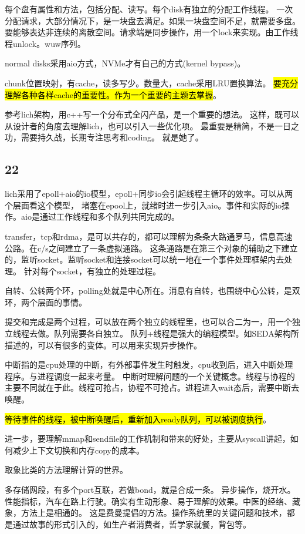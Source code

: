 每个盘有属性和方法，包括分配、读写。每个disk有独立的分配工作线程。
一次分配请求，大部分情况下，是一块盘去满足。如果一块盘空间不足，就需要多盘。
要能够表达非连续的离散空间。请求端是同步操作，用一个lock来实现。由工作线程unlock。wuw序列。

normal disks采用aio方式，NVMe才有自己的方式(kernel bypass)。

chunk位置映射，有cache，读多写少。数量大，cache采用LRU置换算法。
\hl{要充分理解各种各样cache的重要性。作为一个重要的主题去掌握}。

参考lich架构，用c++写一个分布式全闪产品，是一个重要的想法。
这样，既可以从设计者的角度去理解lich，也可以引入一些优化项。
最重要是精简，不是一日之功，需要持久战，长期专注思考和coding。
就是她了。

\subsection{22}

lich采用了epoll+aio的io模型，epoll+同步io会引起线程主循环的效率。可以从两个层面看这个模型，
堵塞在epool上，就绪时进一步引入aio。事件和实际的io操作。aio是通过工作线程和多个队列共同完成的。

transfer，tcp和rdma，是可以共存的，都可以理解为条条大路通罗马，信息高速公路。在c/s之间建立了一条虚拟通路。
这条通路是在第三个对象的辅助之下建立的，监听socket。监听socket和连接socket可以统一地在一个事件处理框架内去处理。
针对每个socket，有独立的处理过程。

自转、公转两个环，polling处就是中心所在。消息有自转，也围绕中心公转，是双环，两个层面的事情。

提交和完成是两个过程，可以放在两个独立的线程里，也可以合二为一，用一个独立线程去做。队列需要各自独立。
队列+线程是强大的编程模型。如SEDA架构所描述的，可以有很多的变体。可以用来实现异步操作。

中断指的是cpu处理的中断，有外部事件发生时触发，cpu收到后，进入中断处理程序。与进程调度一起来考量。
中断时理解问题的一个关键概念。线程与协程的主要不同就在于此。线程可抢占，协程不可抢占。进程进入wait态后，需要中断去唤醒。

\hl{等待事件的线程，被中断唤醒后，重新加入ready队列，可以被调度执行}。

进一步，要理解mmap和sendfile的工作机制和带来的好处，主要从syscall讲起，如何减少上下文切换和内存copy的成本。

取象比类的方法理解计算的世界。

多存储网段，有多个port互联，若做bond，就是合成一条。
异步操作，烧开水。性能指标，汽车在路上行驶。确实有生动形象、易于理解的效果。中医的经络、藏象，方法上是相通的。
这是费曼提倡的方法。操作系统里的关键问题和技术，都是通过故事的形式引入的，如生产者消费者，哲学家就餐，背包等。

